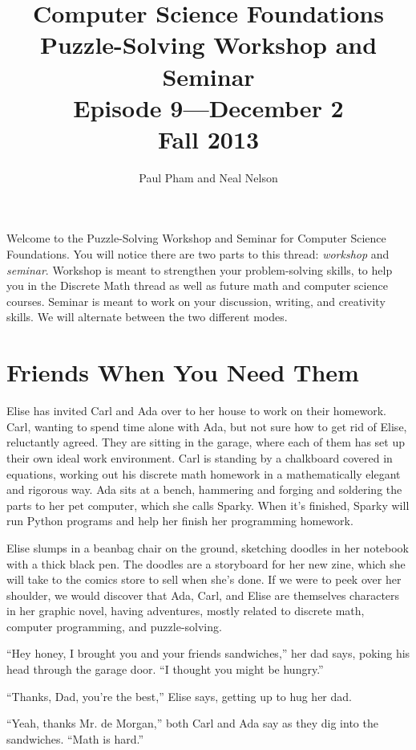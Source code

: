 \documentclass{article}
\title{Computer Science Foundations\\ Puzzle-Solving Workshop and Seminar\\
\large{Episode 9---December 2}\\
Fall 2013}
\author{Paul Pham and Neal Nelson}
\begin{document}
\maketitle

Welcome to the Puzzle-Solving Workshop and Seminar for
Computer Science Foundations. You will notice there are
two parts to this thread: \emph{workshop} and \emph{seminar}.
Workshop is meant to strengthen your problem-solving skills,
to help you in the Discrete Math thread as well as future
math and computer science courses. Seminar is meant to
work on your discussion, writing, and creativity skills.
We will alternate between the two different modes.

\section{Friends When You Need Them}

Elise has invited Carl and Ada over to her house to work on their
homework. Carl, wanting to spend time alone with Ada, but not sure
how to get rid of Elise, reluctantly agreed.
They are sitting in the garage, where each of them has
set up their own ideal work environment. Carl is standing by a
chalkboard covered in equations, working out his discrete math
homework in a
mathematically elegant and rigorous way. Ada sits at a bench,
hammering and forging and soldering the parts to her pet
computer, which she calls Sparky. When it's finished, Sparky
will run Python programs and help her finish her programming
homework.

Elise slumps in a beanbag
chair on the ground, sketching doodles in her notebook with a
thick black pen. The doodles are a storyboard for her new zine,
which she will take to the comics store to sell when she's
done. If we were to peek over her shoulder, we would
discover that Ada, Carl, and Elise are themselves characters
in her graphic novel, having adventures, mostly related to
discrete math, computer programming, and puzzle-solving.

``Hey honey, I brought you and your friends sandwiches,''
her dad says, poking his head through the garage door.
``I thought you might be hungry.''

``Thanks, Dad, you're the best,'' Elise says, getting up
to hug her dad.

``Yeah, thanks Mr. de Morgan,'' both Carl and Ada say as
they dig into the sandwiches. ``Math is hard.''
\end{document}
